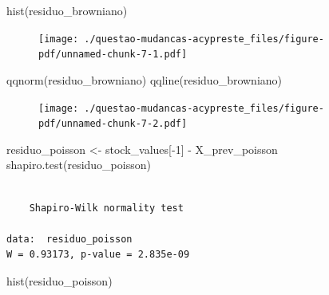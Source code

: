\documentclass[
  letterpaper,
  DIV=11,
  numbers=noendperiod]{scrreprt}
\newenvironment{Shaded}{\begin{snugshade}}{\end{snugshade}}
\newcommand{\DecValTok}[1]{\textcolor[rgb]{0.68,0.00,0.00}{#1}}
\newcommand{\FunctionTok}[1]{\textcolor[rgb]{0.28,0.35,0.67}{#1}}
\newcommand{\NormalTok}[1]{\textcolor[rgb]{0.00,0.23,0.31}{#1}}
\newcommand{\OtherTok}[1]{\textcolor[rgb]{0.00,0.23,0.31}{#1}}
\newcommand{\SpecialCharTok}[1]{\textcolor[rgb]{0.37,0.37,0.37}{#1}}
\begin{document}
\begin{Shaded}
\begin{Highlighting}[]
\FunctionTok{hist}\NormalTok{(residuo\_browniano)}
\end{Highlighting}
\end{Shaded}

\begin{figure}[H]

{\centering \texttt{[image: ./questao-mudancas-acypreste\_files/figure-pdf/unnamed-chunk-7-1.pdf]}

}

\end{figure}

\begin{Shaded}
\begin{Highlighting}[]
\FunctionTok{qqnorm}\NormalTok{(residuo\_browniano)}
\FunctionTok{qqline}\NormalTok{(residuo\_browniano)}
\end{Highlighting}
\end{Shaded}

\begin{figure}[H]

{\centering \texttt{[image: ./questao-mudancas-acypreste\_files/figure-pdf/unnamed-chunk-7-2.pdf]}

}

\end{figure}

\begin{Shaded}
\begin{Highlighting}[]
\NormalTok{residuo\_poisson }\OtherTok{\textless{}{-}}\NormalTok{ stock\_values[}\SpecialCharTok{{-}}\DecValTok{1}\NormalTok{] }\SpecialCharTok{{-}}\NormalTok{ X\_prev\_poisson}
\FunctionTok{shapiro.test}\NormalTok{(residuo\_poisson)}
\end{Highlighting}
\end{Shaded}

\begin{verbatim}

    Shapiro-Wilk normality test

data:  residuo_poisson
W = 0.93173, p-value = 2.835e-09
\end{verbatim}

\begin{Shaded}
\begin{Highlighting}[]
\FunctionTok{hist}\NormalTok{(residuo\_poisson)}
\end{Highlighting}
\end{Shaded}
\end{document}
